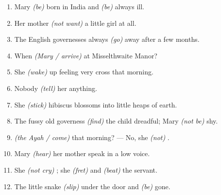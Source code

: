 \documentclass{fiche}
\begin{document}
\entete





\begin{anglais}
\begin{enumerate}[label=\arabic*.,itemsep=2.2mm,leftmargin=*]
  \item Mary \emph{(be)}  born in India and \emph{(be)}  always ill.
  \item Her mother \emph{(not want)}  a little girl at all.
  \item The English governesses always \emph{(go)}  away after a few months.
  \item When \emph{(Mary / arrive)}  at Misselthwaite Manor?
  \item She \emph{(wake)}  up feeling very cross that morning.
  \item Nobody \emph{(tell)}  her anything.
  \item She \emph{(stick)}  hibiscus blossoms into little heaps of earth.
  \item The fussy old governess \emph{(find)}  the child dreadful; Mary
    \emph{(not be)}  shy.
  \item \emph{(the Ayah / come)}  that morning? --- No, she
    \emph{(not)} .
  \item Mary \emph{(hear)}  her mother speak in a low voice.
  \item She \emph{(not cry)} ; she \emph{(fret)}  and
    \emph{(beat)}  the servant.
  \item The little snake \emph{(slip)}  under the door and \emph{(be)}
     gone.
\end{enumerate}
\end{anglais}
\end{document}
